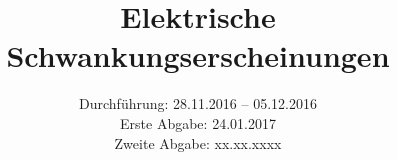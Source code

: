 

\subject{Versuch 57}
\title{Elektrische Schwankungserscheinungen}
\date{Durchführung: 28.11.2016 -- 05.12.2016 \\
      Erste Abgabe: 24.01.2017 \\
      Zweite Abgabe: xx.xx.xxxx}



\maketitle
\newpage







\newpage


\printbibliography



